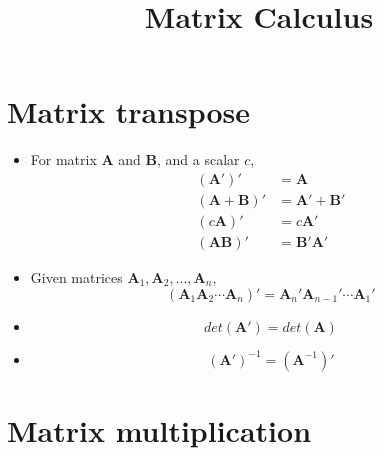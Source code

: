 \documentclass[10pt]{article}
\title{Matrix Calculus}
\author{}
\date{}
\begin{document}
\maketitle
\tableofcontents


\section{Matrix transpose}

\begin{itemize}
\item 
For matrix $ \bm{A} $ and $ \bm{B} $, and a scalar $ c $,
\begin{align*}
(\bm{A}')' &= \bm{A}\\
(\bm{A} + \bm{B})' &= \bm{A}' + \bm{B}'\\
(c\bm{A})' &= c\bm{A}'\\
(\bm{A}\bm{B})'&= \bm{B}'\bm{A}'
\end{align*}
\item 
Given matrices $ \bm{A}_{1}, \bm{A}_{2},..., \bm{A}_{n} $, 
\begin{equation}
(\bm{A}_{1}\bm{A}_{2}\cdots \bm{A}_{n})' = \bm{A}_{n}'\bm{A}_{n - 1}'\cdots \bm{A}_{1}'
\end{equation}

\item 
		\begin{equation}
		det(\bm{A}') = det(\bm{A})
		\end{equation}
\item 
		\begin{equation}
		(\bm{A}')^{ - 1} = (\bm{A}^{ - 1})'
		\end{equation}


\end{itemize}






\section{Matrix multiplication}
\end{document}

